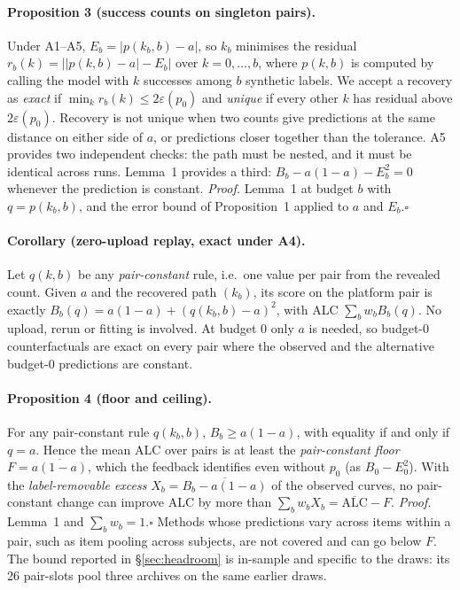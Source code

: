 \paragraph{Proposition 3 (success counts on singleton pairs).}
Under A1--A5, $E_b=|p(k_b,b)-a|$, so $k_b$ minimises the residual $r_b(k)=\bigl||p(k,b)-a|-E_b\bigr|$ over
$k=0,\dots,b$, where $p(k,b)$ is computed by calling the model with $k$ successes among $b$ synthetic labels. We accept
a recovery as \emph{exact} if $\min_k r_b(k)\le2\varepsilon(p_0)$ and \emph{unique} if every other $k$ has residual above
$2\varepsilon(p_0)$. Recovery is not unique when two counts give predictions at the same distance on either side of $a$, or
predictions closer together than the tolerance. A5 provides two independent checks: the path must be nested, and
it must be identical across runs. Lemma~1 provides a third: $B_b-a(1-a)-E_b^2=0$ whenever the prediction is constant.
\textit{Proof.} Lemma~1 at budget $b$ with $q=p(k_b,b)$, and the error bound of Proposition~1 applied to $a$ and
$E_b$.\hfill$\square$

\paragraph{Corollary (zero-upload replay, exact under A4).}
Let $q(k,b)$ be any \emph{pair-constant} rule, i.e.\ one value per pair from the revealed count. Given $a$ and the
recovered path $(k_b)$, its score on the platform pair is exactly $B_b(q)=a(1-a)+(q(k_b,b)-a)^2$, with ALC
$\sum_bw_bB_b(q)$. No upload, rerun or fitting is involved. At budget 0 only $a$ is needed, so budget-0
counterfactuals are exact on every pair where the observed and the alternative budget-0 predictions are constant.

\paragraph{Proposition 4 (floor and ceiling).}
For any pair-constant rule $q(k_b,b)$, $B_b\ge a(1-a)$, with equality if and only if $q=a$. Hence the mean ALC over pairs is at
least the \emph{pair-constant floor} $F=\overline{a(1-a)}$, which the feedback identifies even without $p_0$ (as
$B_0-E_0^2$). With the \emph{label-removable excess} $X_b=\overline{B_b-a(1-a)}$ of the observed curves, no pair-constant
change can improve ALC by more than $\sum_bw_bX_b=\overline{\mathrm{ALC}}-F$. \textit{Proof.} Lemma~1 and
$\sum_bw_b=1$.\hfill$\square$ Methods whose predictions vary across items within a pair, such as item pooling across
subjects, are not covered and can go below $F$. The bound reported in \S\ref{sec:headroom} is in-sample and
specific to the draws: its 26 pair-slots pool three archives on the same earlier draws.


